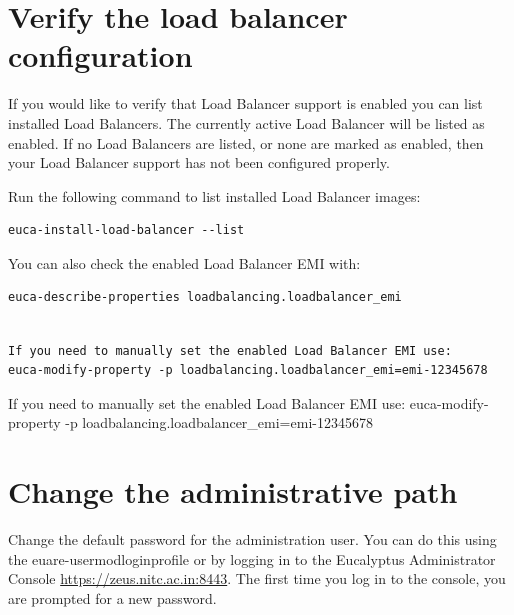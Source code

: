 \section{Verify the load balancer configuration}

If you would like to verify that Load Balancer support is enabled you can list installed Load Balancers. The currently active Load Balancer will be listed as enabled. If no Load Balancers are listed, or none are marked as enabled, then your Load Balancer support has not been configured properly.

Run the following command to list installed Load Balancer images:
\begin{lstlisting}
euca-install-load-balancer --list
\end{lstlisting}
You can also check the enabled Load Balancer EMI with:
\begin{lstlisting}
euca-describe-properties loadbalancing.loadbalancer_emi
\end{lstlisting}
\begin{lstlisting}

If you need to manually set the enabled Load Balancer EMI use:
euca-modify-property -p loadbalancing.loadbalancer_emi=emi-12345678
\end{lstlisting}
If you need to manually set the enabled Load Balancer EMI use:
euca-modify-property -p loadbalancing.loadbalancer_emi=emi-12345678

\section{Change the administrative path}
Change the default password for the administration user. You can do this using the euare-usermodloginprofile or by logging in to the Eucalyptus Administrator Console \url{https://zeus.nitc.ac.in:8443}. The first time you log in to the console, you are prompted for a new password.
